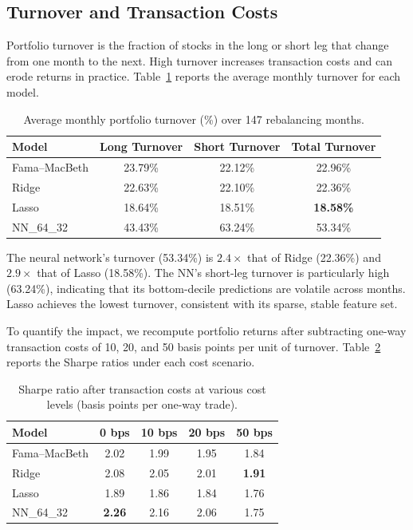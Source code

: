 \documentclass[11pt]{article}
\begin{document}
\subsection{Turnover and Transaction Costs}
\label{sec:turnover}

Portfolio turnover is the fraction of stocks in the long or short leg that change from one month to the next. High turnover increases transaction costs and can erode returns in practice. Table~\ref{tab:turnover} reports the average monthly turnover for each model.

\begin{table}[H]
\centering
\caption{Average monthly portfolio turnover (\%) over 147 rebalancing months.}
\label{tab:turnover}
\begin{tabular}{lccc}
\toprule
Model & Long Turnover & Short Turnover & Total Turnover \\
\midrule
Fama--MacBeth & 23.79\% & 22.12\% & 22.96\% \\
Ridge         & 22.63\% & 22.10\% & 22.36\% \\
Lasso         & 18.64\% & 18.51\% & \textbf{18.58\%} \\
NN\_64\_32    & 43.43\% & 63.24\% & 53.34\% \\
\bottomrule
\end{tabular}
\end{table}

The neural network's turnover (53.34\%) is $2.4\times$ that of Ridge (22.36\%) and $2.9\times$ that of Lasso (18.58\%). The NN's short-leg turnover is particularly high (63.24\%), indicating that its bottom-decile predictions are volatile across months. Lasso achieves the lowest turnover, consistent with its sparse, stable feature set.

To quantify the impact, we recompute portfolio returns after subtracting one-way transaction costs of 10, 20, and 50 basis points per unit of turnover. Table~\ref{tab:cost_adjusted} reports the Sharpe ratios under each cost scenario.

\begin{table}[H]
\centering
\caption{Sharpe ratio after transaction costs at various cost levels (basis points per one-way trade).}
\label{tab:cost_adjusted}
\begin{tabular}{lcccc}
\toprule
Model & 0 bps & 10 bps & 20 bps & 50 bps \\
\midrule
Fama--MacBeth & 2.02 & 1.99 & 1.95 & 1.84 \\
Ridge         & 2.08 & 2.05 & 2.01 & \textbf{1.91} \\
Lasso         & 1.89 & 1.86 & 1.84 & 1.76 \\
NN\_64\_32    & \textbf{2.26} & 2.16 & 2.06 & 1.75 \\
\bottomrule
\end{tabular}
\end{table}
\end{document}
